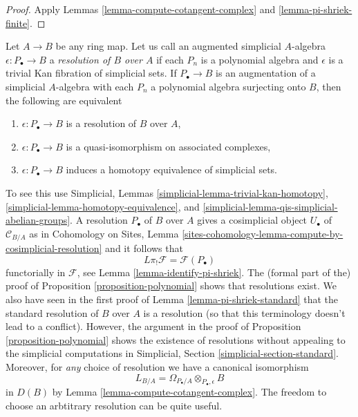 \begin{proof}
Apply Lemmas \ref{lemma-compute-cotangent-complex} and
\ref{lemma-pi-shriek-finite}.
\end{proof}

\begin{remark}[Resolutions]
\label{remark-resolution}
Let $A \to B$ be any ring map. Let us call an augmented simplicial $A$-algebra
$\epsilon : P_\bullet \to B$ a {\it resolution of $B$ over $A$} if
each $P_n$ is a polynomial algebra and $\epsilon$ is a trivial Kan fibration
of simplicial sets. If $P_\bullet \to B$ is an augmentation of a simplicial
$A$-algebra with each $P_n$ a polynomial algebra surjecting onto $B$, then
the following are equivalent
\begin{enumerate}
\item $\epsilon : P_\bullet \to B$ is a resolution of $B$ over $A$,
\item $\epsilon : P_\bullet \to B$ is a quasi-isomorphism on
associated complexes,
\item $\epsilon : P_\bullet \to B$ induces a homotopy equivalence
of simplicial sets.
\end{enumerate}
To see this use Simplicial, Lemmas
\ref{simplicial-lemma-trivial-kan-homotopy},
\ref{simplicial-lemma-homotopy-equivalence}, and
\ref{simplicial-lemma-qis-simplicial-abelian-groups}.
A resolution $P_\bullet$ of $B$ over $A$ gives a cosimplicial object
$U_\bullet$ of $\mathcal{C}_{B/A}$ as in Cohomology on Sites, Lemma
\ref{sites-cohomology-lemma-compute-by-cosimplicial-resolution}
and it follows that
$$
L\pi_!\mathcal{F} = \mathcal{F}(P_\bullet)
$$
functorially in $\mathcal{F}$, see Lemma \ref{lemma-identify-pi-shriek}.
The (formal part of the) proof of Proposition \ref{proposition-polynomial}
shows that resolutions exist. We also have seen in the first proof of
Lemma \ref{lemma-pi-shriek-standard} that the standard resolution of $B$
over $A$ is a resolution (so that this terminology doesn't lead to a conflict).
However, the argument in the proof of Proposition \ref{proposition-polynomial}
shows the existence of resolutions without appealing to the simplicial
computations in Simplicial, Section \ref{simplicial-section-standard}.
Moreover, for {\it any} choice of resolution we have a canonical isomorphism
$$
L_{B/A} = \Omega_{P_\bullet/A} \otimes_{P_\bullet, \epsilon} B
$$
in $D(B)$ by Lemma \ref{lemma-compute-cotangent-complex}. The freedom to
choose an arbtitrary resolution can be quite useful.
\end{remark}

